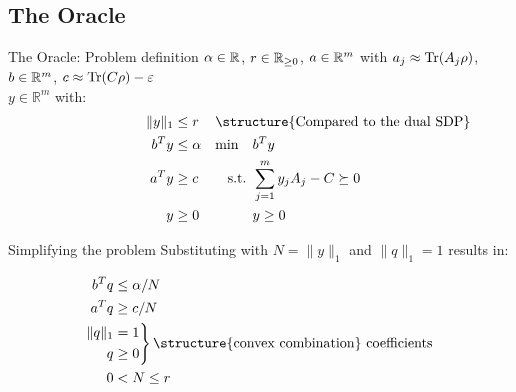 \subsection{The Oracle}

\begin{frame}{The Oracle: Problem definition}
 $\alpha\in\mathbb{R}$, $r\in \mathbb{R}_{\geq 0}$, $a\in \mathbb{R}^m$ with $a_j\approx \operatorname{Tr}(A_j \rho)$, $b\in \mathbb{R}^m$, $c\approx \operatorname{Tr}(C\rho)-\varepsilon$\\
\vspace{1cm}
 $y\in \mathbb{R}^m$ with:
\begin{align*}
\|y\|_1&\leq r & \omit\rlap{\structure{Compared to the dual SDP}}\\
b^T y&\leq \alpha&\min \quad &b^T y\\
a^T y&\geq c& \text{s.t. } &\sum_{j=1}^m y_j A_j - C\succeq 0\\
y&\geq 0 & &y\geq 0
\end{align*}

\end{frame}

\begin{frame}{Simplifying the problem}
Substituting  with $N=\|y\|_1$ and $\|q\|_1=1$ results in:

\begin{equation*}
 \begin{split}
  b^T q&\leq \alpha/N\\
  a^T q&\geq c/N\\
  \begin{aligned}
   \|q\|_1\\
   q
  \end{aligned}
  &
  \begin{rcases*}
   =1\\
   \geq 0
  \end{rcases*} \text{\structure{convex combination} coefficients}  \\
  0&<N\leq r
 \end{split}
\end{equation*}
\end{frame}


